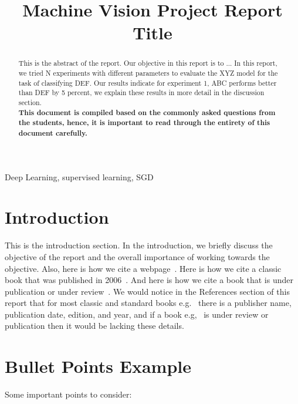 \documentclass[conference]{IEEEtran}
\title{Machine Vision Project Report Title}
\author{
    \IEEEauthorblockN{Candidate no 11, 23, and 71}    
}
\begin{document}
\maketitle

\begin{abstract}
    This is the abstract of the report. Our objective in this report is to ... In this report, we tried N experiments with different parameters to evaluate the XYZ model for the task of classifying DEF. Our results indicate for experiment 1, ABC performs better than DEF by 5 percent, we explain these results in more detail in the discussion section. 
    \\
    \color{red}
    \textbf{This document is compiled based on the commonly asked questions from the students, hence, it is important to read through the entirety of this document carefully.}
    \color{black}
   
   
\end{abstract}

\begin{IEEEkeywords}
    Deep Learning, supervised learning, SGD
\end{IEEEkeywords}



\section{Introduction}
This is the introduction section. In the introduction, we briefly discuss the objective of the report and the overall importance of working towards the objective.
Also, here is how we cite a webpage~\cite{webpage_example}.
Here is how we cite a classic book that was published in 2006~\cite{Gonzalez2006}.
And here is how we cite a book that is under publication or under review~\cite{scardapane2024book}. We would notice in the References section of this report that for most classic and standard books e.g.~\cite{Gonzalez2006}  there is a publisher name, publication date, edition, and year, and if a book e.g,~\cite{scardapane2024book} is under review or publication then it would be lacking these details.

\section{Bullet Points Example}

Some important points to consider:
\end{document}
